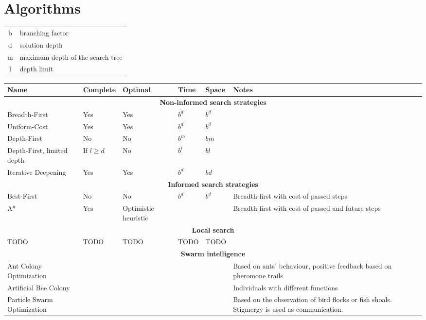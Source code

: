 \documentclass[]{article}
\begin{document}
\section{Algorithms}

\begin{table}[h]
	\centering
	
	\begin{tabular}{ c l }
		b & branching factor\\
		d & solution depth\\
		m & maximum depth of the search tree\\
		l & depth limit\\
	\end{tabular}

	\begin{tabular}{|p{12em}|p{4em}|p{4em}|p{3em}|p{3em}|p{13em}|}
		\hline
		Name & Complete & Optimal & Time & Space & Notes\\
		\hline
		\multicolumn{6}{|c|}{\textbf{Non-informed search strategies}} \\
		\hline
		Breadth-First & Yes & Yes & $b^d$ & $b^d$ & \\
		\hline
		Uniform-Cost & Yes & Yes & $b^d$ & $b^d$ & \\
		\hline
		Depth-First & No & No & $b^m$ & $bm$ & \\
		\hline
		Depth-First, limited depth & If $l \ge d$ & No & $b^l$ & $bl$ & \\
		\hline
		Iterative Deepening & Yes & Yes & $b^d$ & $bd$ & \\
		\hline
		\multicolumn{6}{|c|}{\textbf{Informed search strategies}} \\
		\hline
		Best-First & No & No & $b^d$ & $b^d$ & Breadth-first with cost of passed steps \\
		\hline
		A* & Yes & Optimistic heuristic &  &  & Breadth-first with cost of passed and future steps \\
		\hline
		\multicolumn{6}{|c|}{\textbf{Local search}} \\
		\hline
		TODO & TODO & TODO & TODO & TODO & \\
		\hline
		\multicolumn{6}{|c|}{\textbf{Swarm intelligence}} \\
		\hline
		Ant Colony Optimization &  &  &  &  & Based on ants' behaviour, positive feedback based on pheromone trails \\
		\hline
		Artificial Bee Colony &  &  &  &  & Individuals with different functions \\
		\hline
		Particle Swarm Optimization &  &  &  &  & Based on the observation of bird flocks or fish shoals. Stigmergy is used as communication. \\

\end{tabular}
\end{table}
\end{document}
